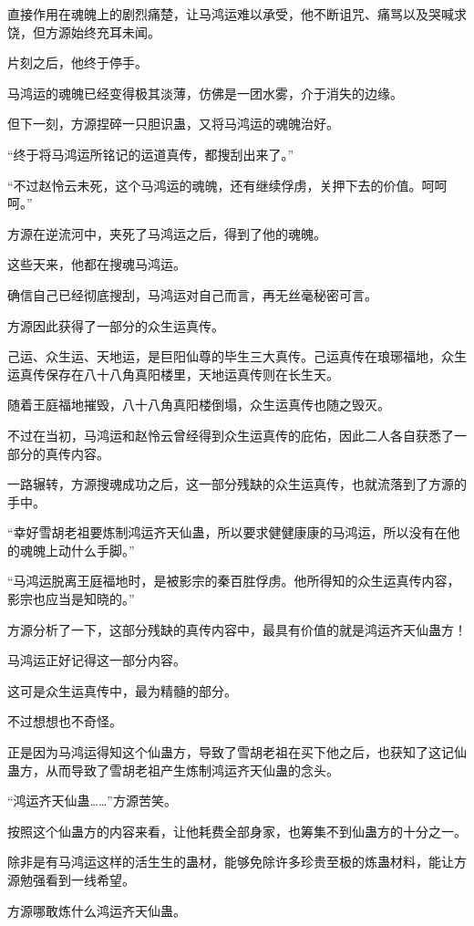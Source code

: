 \begin{this_body}
直接作用在魂魄上的剧烈痛楚，让马鸿运难以承受，他不断诅咒、痛骂以及哭喊求饶，但方源始终充耳未闻。

片刻之后，他终于停手。

马鸿运的魂魄已经变得极其淡薄，仿佛是一团水雾，介于消失的边缘。

但下一刻，方源捏碎一只胆识蛊，又将马鸿运的魂魄治好。

“终于将马鸿运所铭记的运道真传，都搜刮出来了。”

“不过赵怜云未死，这个马鸿运的魂魄，还有继续俘虏，关押下去的价值。呵呵呵。”

方源在逆流河中，夹死了马鸿运之后，得到了他的魂魄。

这些天来，他都在搜魂马鸿运。

确信自己已经彻底搜刮，马鸿运对自己而言，再无丝毫秘密可言。

方源因此获得了一部分的众生运真传。

己运、众生运、天地运，是巨阳仙尊的毕生三大真传。己运真传在琅琊福地，众生运真传保存在八十八角真阳楼里，天地运真传则在长生天。

随着王庭福地摧毁，八十八角真阳楼倒塌，众生运真传也随之毁灭。

不过在当初，马鸿运和赵怜云曾经得到众生运真传的庇佑，因此二人各自获悉了一部分的真传内容。

一路辗转，方源搜魂成功之后，这一部分残缺的众生运真传，也就流落到了方源的手中。

“幸好雪胡老祖要炼制鸿运齐天仙蛊，所以要求健健康康的马鸿运，所以没有在他的魂魄上动什么手脚。”

“马鸿运脱离王庭福地时，是被影宗的秦百胜俘虏。他所得知的众生运真传内容，影宗也应当是知晓的。”

方源分析了一下，这部分残缺的真传内容中，最具有价值的就是鸿运齐天仙蛊方！

马鸿运正好记得这一部分内容。

这可是众生运真传中，最为精髓的部分。

不过想想也不奇怪。

正是因为马鸿运得知这个仙蛊方，导致了雪胡老祖在买下他之后，也获知了这记仙蛊方，从而导致了雪胡老祖产生炼制鸿运齐天仙蛊的念头。

“鸿运齐天仙蛊……”方源苦笑。

按照这个仙蛊方的内容来看，让他耗费全部身家，也筹集不到仙蛊方的十分之一。

除非是有马鸿运这样的活生生的蛊材，能够免除许多珍贵至极的炼蛊材料，能让方源勉强看到一线希望。

方源哪敢炼什么鸿运齐天仙蛊。


\end{this_body}
